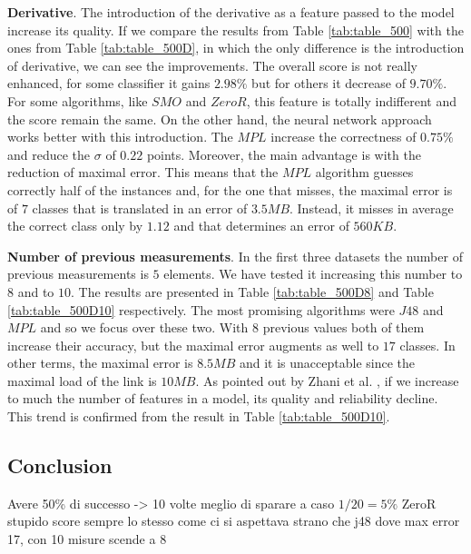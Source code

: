 \documentclass[12pt]{article}
\begin{document}
\textbf{Derivative}.
The introduction of the derivative as a feature passed to the model increase its quality.
If we compare the results from Table \ref{tab:table_500} with the ones from Table \ref{tab:table_500D}, in which the only difference is the introduction of derivative, we can see the improvements.
The overall score is not really enhanced, for some classifier it gains $2.98\%$ but for others it decrease of $9.70\%$.
For some algorithms, like $SMO$ and $ZeroR$, this feature is totally indifferent and the score remain the same.
On the other hand, the neural network approach works better with this introduction. The $MPL$ increase the correctness of $0.75\%$ and reduce the $\sigma$ of $0.22$ points. 
Moreover, the main advantage is with the reduction of maximal error. 
This means that the $MPL$ algorithm guesses correctly half of the instances and, for the one that misses, the maximal error is of $7$ classes that is translated in an error of $3.5MB$. 
Instead, it misses in average the correct class only by $1.12$ and that determines an error of $560KB$.


\textbf{Number of previous measurements}.
In the first three datasets the number of previous measurements is $5$ elements. 
We have tested it increasing this number to $8$ and to $10$. 
The results are presented in Table \ref{tab:table_500D8} and Table \ref{tab:table_500D10} respectively.
The most promising algorithms were $J48$ and $MPL$ and so we focus over these two.
With $8$ previous values both of them increase their accuracy, but the maximal error augments as well to $17$ classes. 
In other terms, the maximal error is $8.5MB$ and it is unacceptable since the maximal load of the link is $10MB$.
As pointed out by Zhani et al. \cite{zha}, if we increase to much the number of features in a model, its quality and reliability decline.
This trend is confirmed from the result in Table \ref{tab:table_500D10}.


\subsection{Conclusion} 
Avere 50\% di successo -> 10 volte meglio di sparare a caso $1/20 = 5\%$
ZeroR stupido score sempre lo stesso come ci si aspettava
strano che j48 dove max error 17, con 10 misure scende a 8


\printbibliography 

	
\end{document}

